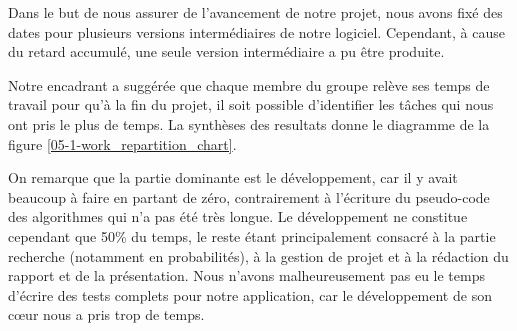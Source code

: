 Dans le but de nous assurer de l'avancement de notre projet, nous avons fixé des dates pour plusieurs versions intermédiaires de notre logiciel. Cependant, à cause du retard accumulé, une seule version intermédiaire a pu être produite.

Notre encadrant a suggérée que chaque membre du groupe relève ses temps de travail pour qu'à la fin du projet, il soit possible d'identifier les tâches qui nous ont pris le plus de temps. La synthèses des resultats donne le diagramme de la figure \ref{05-1-work_repartition_chart}.

On remarque que la partie dominante est le développement, car il y avait beaucoup à faire en partant de zéro, contrairement à l'écriture du pseudo-code des algorithmes qui n'a pas été très longue. Le développement ne constitue cependant que 50\% du temps, le reste étant principalement consacré à la partie recherche (notamment en probabilités), à la gestion de projet et à la rédaction du rapport et de la présentation.
Nous n'avons malheureusement pas eu le temps d'écrire des tests complets pour notre application, car le développement de son cœur nous a pris trop de temps.


